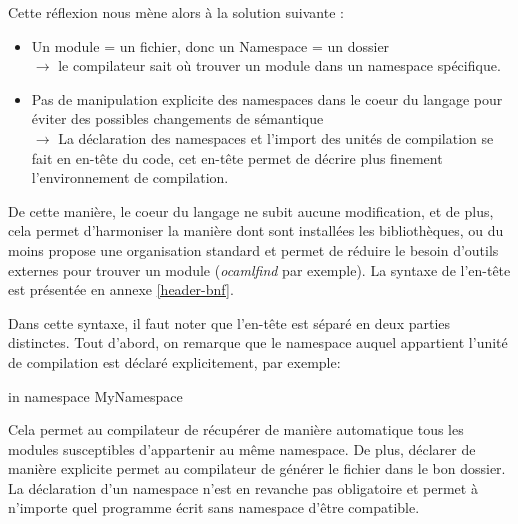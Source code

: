 \documentclass[11pt,a4paper]{report}
\begin{document}
Cette réflexion nous mène alors à la solution suivante :
\begin{itemize}
\item Un module = un fichier, donc un Namespace = un dossier \\ $\rightarrow$ le
  compilateur sait où trouver un module dans un namespace spécifique.
\item Pas de manipulation explicite des namespaces dans le coeur du langage pour
  éviter des possibles changements de sémantique \\
  $\rightarrow$ La déclaration des namespaces et l'import des unités de
  compilation se fait en en-tête du code, cet en-tête permet de décrire plus
  finement l'environnement de compilation.
\end{itemize}

De cette manière, le coeur du langage ne subit aucune modification, et de plus,
cela permet d'harmoniser la manière dont sont installées les bibliothèques, ou du
moins propose une organisation standard et permet de réduire le besoin d'outils
externes pour trouver un module (\emph{ocamlfind} par exemple). La syntaxe de
l'en-tête est présentée en annexe \ref{header-bnf}.


Dans cette syntaxe, il faut noter que l'en-tête est séparé en deux parties
distinctes. Tout d'abord, on remarque que le namespace auquel appartient l'unité
de compilation est déclaré explicitement, par exemple:
\begin{OCaml}
in namespace MyNamespace
\end{OCaml}
Cela permet au compilateur de récupérer de manière automatique tous les modules
susceptibles d'appartenir au même namespace. De plus, déclarer de manière
explicite permet au compilateur de générer le fichier dans le bon dossier. La
déclaration d'un namespace n'est en revanche pas obligatoire et permet à
n'importe quel programme écrit sans namespace d'être compatible.
\end{document}
